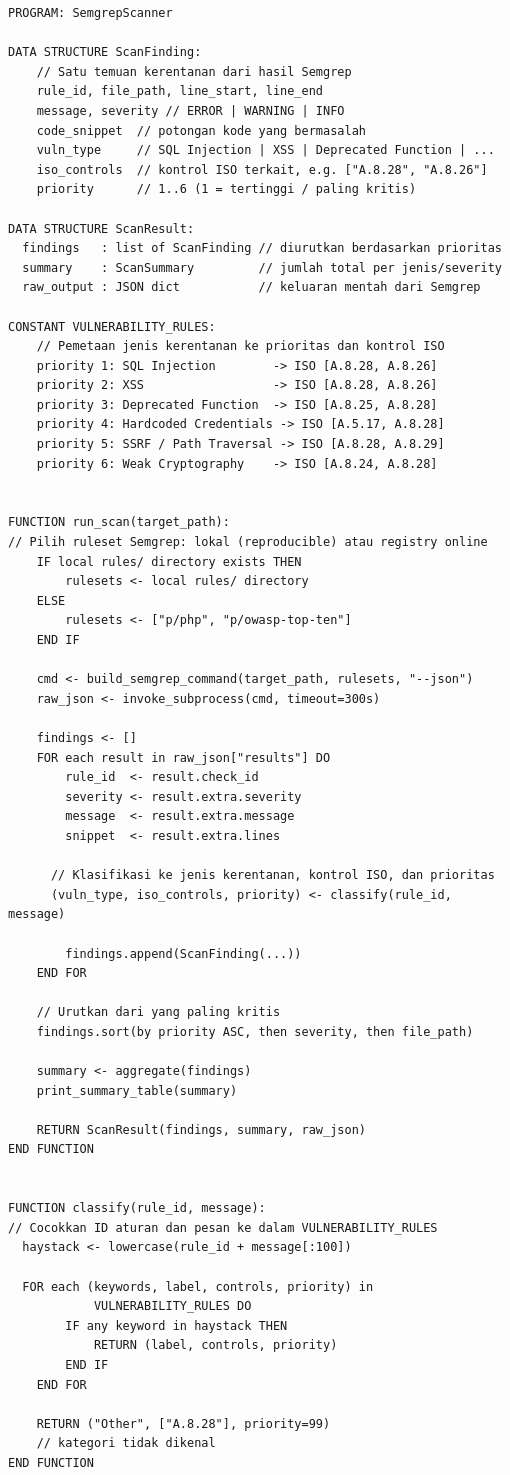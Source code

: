 \begin{lstlisting}[style=pseudocodestyle]
PROGRAM: SemgrepScanner

DATA STRUCTURE ScanFinding:
    // Satu temuan kerentanan dari hasil Semgrep
    rule_id, file_path, line_start, line_end
    message, severity // ERROR | WARNING | INFO
    code_snippet  // potongan kode yang bermasalah
    vuln_type     // SQL Injection | XSS | Deprecated Function | ...
    iso_controls  // kontrol ISO terkait, e.g. ["A.8.28", "A.8.26"]
    priority      // 1..6 (1 = tertinggi / paling kritis)

DATA STRUCTURE ScanResult:
  findings   : list of ScanFinding // diurutkan berdasarkan prioritas
  summary    : ScanSummary         // jumlah total per jenis/severity
  raw_output : JSON dict           // keluaran mentah dari Semgrep

CONSTANT VULNERABILITY_RULES:
    // Pemetaan jenis kerentanan ke prioritas dan kontrol ISO
    priority 1: SQL Injection        -> ISO [A.8.28, A.8.26]
    priority 2: XSS                  -> ISO [A.8.28, A.8.26]
    priority 3: Deprecated Function  -> ISO [A.8.25, A.8.28]
    priority 4: Hardcoded Credentials -> ISO [A.5.17, A.8.28]
    priority 5: SSRF / Path Traversal -> ISO [A.8.28, A.8.29]
    priority 6: Weak Cryptography    -> ISO [A.8.24, A.8.28]


FUNCTION run_scan(target_path):
// Pilih ruleset Semgrep: lokal (reproducible) atau registry online
    IF local rules/ directory exists THEN
        rulesets <- local rules/ directory
    ELSE
        rulesets <- ["p/php", "p/owasp-top-ten"]
    END IF

    cmd <- build_semgrep_command(target_path, rulesets, "--json")
    raw_json <- invoke_subprocess(cmd, timeout=300s)

    findings <- []
    FOR each result in raw_json["results"] DO
        rule_id  <- result.check_id
        severity <- result.extra.severity
        message  <- result.extra.message
        snippet  <- result.extra.lines

      // Klasifikasi ke jenis kerentanan, kontrol ISO, dan prioritas
      (vuln_type, iso_controls, priority) <- classify(rule_id, message)

        findings.append(ScanFinding(...))
    END FOR

    // Urutkan dari yang paling kritis
    findings.sort(by priority ASC, then severity, then file_path)

    summary <- aggregate(findings)
    print_summary_table(summary)

    RETURN ScanResult(findings, summary, raw_json)
END FUNCTION


FUNCTION classify(rule_id, message):
// Cocokkan ID aturan dan pesan ke dalam VULNERABILITY_RULES
  haystack <- lowercase(rule_id + message[:100])

  FOR each (keywords, label, controls, priority) in 
            VULNERABILITY_RULES DO
        IF any keyword in haystack THEN
            RETURN (label, controls, priority)
        END IF
    END FOR

    RETURN ("Other", ["A.8.28"], priority=99)  
    // kategori tidak dikenal
END FUNCTION
\end{lstlisting}

